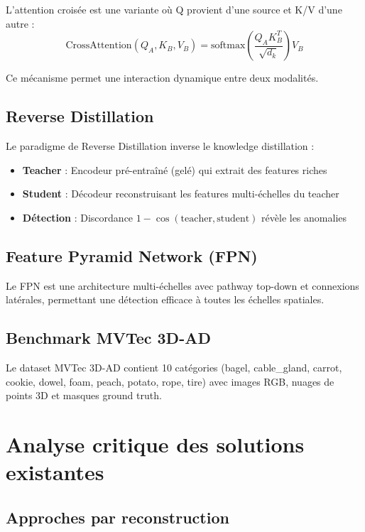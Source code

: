 \documentclass[12pt,a4paper,oneside]{report}
\begin{document}
L'attention croisée est une variante où Q provient d'une source et K/V d'une autre :
\begin{equation}
\text{CrossAttention}(Q_A, K_B, V_B) = \text{softmax}\left(\frac{Q_A K_B^T}{\sqrt{d_k}}\right) V_B
\end{equation}

Ce mécanisme permet une interaction dynamique entre deux modalités.

\subsection{Reverse Distillation}

Le paradigme de Reverse Distillation \cite{deng2022} inverse le knowledge distillation :
\begin{itemize}
    \item \textbf{Teacher} : Encodeur pré-entraîné (gelé) qui extrait des features riches
    \item \textbf{Student} : Décodeur reconstruisant les features multi-échelles du teacher
    \item \textbf{Détection} : Discordance $1 - \cos(\text{teacher}, \text{student})$ révèle les anomalies
\end{itemize}

\subsection{Feature Pyramid Network (FPN)}

Le FPN \cite{lin2017} est une architecture multi-échelles avec pathway top-down et connexions latérales, permettant une détection efficace à toutes les échelles spatiales.

\subsection{Benchmark MVTec 3D-AD}

Le dataset MVTec 3D-AD \cite{bergmann2022} contient 10 catégories (bagel, cable\_gland, carrot, cookie, dowel, foam, peach, potato, rope, tire) avec images RGB, nuages de points 3D et masques ground truth.

\section{Analyse critique des solutions existantes}

\subsection{Approches par reconstruction}
\end{document}
